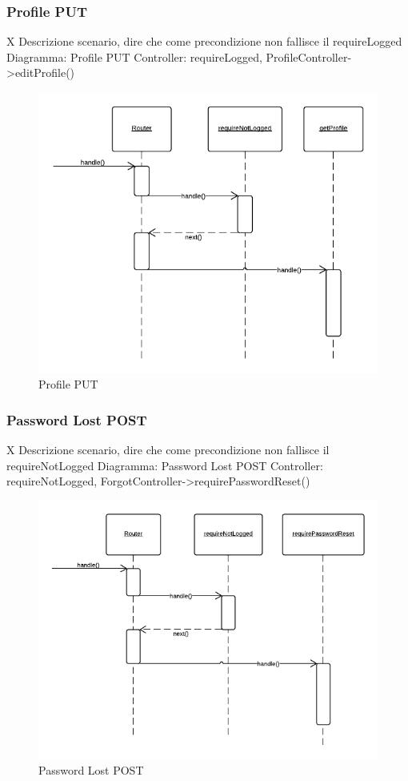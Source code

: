 \subsubsection{Profile PUT} X
Descrizione scenario, dire che come precondizione non fallisce il requireLogged
Diagramma: Profile PUT
Controller: requireLogged, ProfileController->editProfile()
\begin{figure}[H]
	\begin{center} 
		\includegraphics[scale=0.60]{scenari/Profile GET.png} 
		\caption{Profile PUT}
	\end{center} 
\end{figure}

\subsubsection{Password Lost POST} X
Descrizione scenario, dire che come precondizione non fallisce il requireNotLogged
Diagramma: Password Lost POST
Controller: requireNotLogged, ForgotController->requirePasswordReset()
\begin{figure}[H]
	\begin{center} 
		\includegraphics[scale=0.60]{scenari/Password Lost POST.png} 
		\caption{Password Lost POST}
	\end{center} 
\end{figure}

